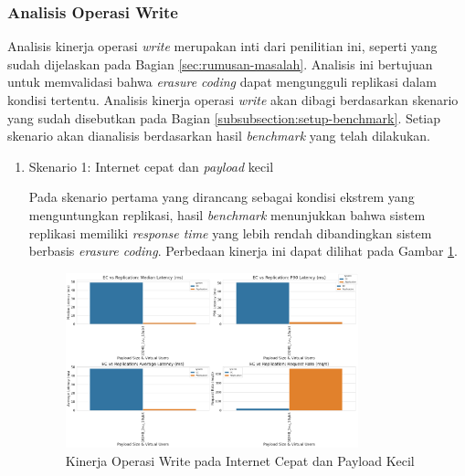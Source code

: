 \subsubsection{Analisis Operasi Write}
\label{subsubsection:analisis-operasi-write}

Analisis kinerja operasi \textit{write} merupakan inti dari penilitian ini, seperti yang sudah dijelaskan pada Bagian \ref{sec:rumusan-masalah}. Analisis ini bertujuan untuk memvalidasi bahwa \textit{erasure coding} dapat mengungguli replikasi dalam kondisi tertentu. Analisis kinerja operasi \textit{write} akan dibagi berdasarkan skenario yang sudah disebutkan pada Bagian \ref{subsubsection:setup-benchmark}. Setiap skenario akan dianalisis berdasarkan hasil \textit{benchmark} yang telah dilakukan.

\begin{enumerate}
	\item Skenario 1: Internet cepat dan \textit{payload} kecil

	      Pada skenario pertama yang dirancang sebagai kondisi ekstrem yang menguntungkan replikasi, hasil \textit{benchmark} menunjukkan bahwa sistem replikasi memiliki \textit{response time} yang lebih rendah dibandingkan sistem berbasis \textit{erasure coding}. Perbedaan kinerja ini dapat dilihat pada Gambar \ref{fig:write-smload-fastnet}.

	      \begin{figure}[ht]
		      \centering
		      \includegraphics[width=0.8\textwidth]{resources/chapter-4/write_smload_fastnet.png}

		      \caption{Kinerja Operasi Write pada Internet Cepat dan Payload Kecil}
		      \label{fig:write-smload-fastnet}
	      \end{figure}


\end{enumerate}
